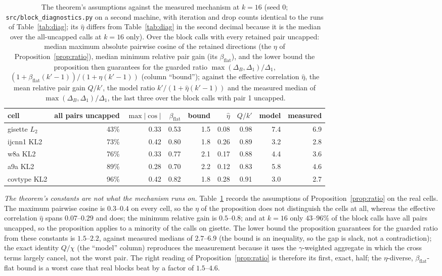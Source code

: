 \begin{table}[t]\centering\scriptsize
\caption{The theorem's assumptions against the measured mechanism at
$k=16$ (seed 0; \texttt{src/block\_diagnostics.py} on a second machine,
with iteration and drop counts identical to the runs of
Table~\ref{tab:diag}; its $\hat\eta$ differs from Table~\ref{tab:diag}
in the second decimal because it is the median over the all-uncapped
calls at $k=16$ only). Over the
block calls with every retained pair uncapped: median maximum absolute
pairwise cosine of the retained directions (the $\eta$ of
Proposition~\ref{prop:ratio}), median minimum relative pair gain (its
$\beta_{\mathrm{flat}}$), and the lower bound the proposition then
guarantees for the guarded ratio $\max(\Delta_B,\Delta_1)/\Delta_1$,
$(1+\beta_{\mathrm{flat}}(k'-1))/(1+\eta(k'-1))$ (column ``bound''); against
the effective correlation $\hat\eta$, the mean relative pair gain
$Q/k'$, the model ratio $k'/(1+\hat\eta(k'-1))$ and the measured median
of $\max(\Delta_B,\Delta_1)/\Delta_1$, the last three over the block
calls with pair 1 uncapped.}\label{tab:assump}
\begin{tabular}{lrrrrrrrr}\toprule
cell & all pairs uncapped & $\max|\cos|$ & $\beta_{\mathrm{flat}}$ & bound & $\hat\eta$ & $Q/k'$ & model & measured \\\midrule
gisette $L_2$ & 43\% & 0.33 & 0.53 & 1.5 & 0.08 & 0.98 & 7.4 & 6.9 \\
ijcnn1 KL2 & 73\% & 0.42 & 0.80 & 1.8 & 0.26 & 0.89 & 3.2 & 2.8 \\
w8a KL2 & 76\% & 0.33 & 0.77 & 2.1 & 0.17 & 0.88 & 4.4 & 3.6 \\
a9a KL2 & 89\% & 0.28 & 0.70 & 2.2 & 0.12 & 0.83 & 5.8 & 4.6 \\
covtype KL2 & 96\% & 0.42 & 0.82 & 1.8 & 0.28 & 0.91 & 3.0 & 2.7 \\
\bottomrule\end{tabular}\end{table}

\emph{The theorem's constants are not what the mechanism runs on.}
Table~\ref{tab:assump} records the assumptions of
Proposition~\ref{prop:ratio} on the real cells. The maximum pairwise
cosine is $0.3$--$0.4$ on every cell, so the $\eta$ of the proposition
does not distinguish the cells at all, whereas the effective correlation
$\hat\eta$ spans $0.07$--$0.29$ and does; the minimum relative gain is
$0.5$--$0.8$; and at $k=16$ only $43$--$96\%$ of the block calls have all
pairs uncapped, so the proposition applies to a minority of the calls on
gisette. The lower bound the proposition guarantees for the guarded
ratio from these constants is $1.5$--$2.2$, against measured medians of
$2.7$--$6.9$ (the bound is an inequality, so the gap is slack, not a
contradiction); the exact
identity $Q/\chi$ (the ``model'' column) reproduces the measurement
because it uses the $\gamma$-weighted aggregate in which the cross terms
largely cancel, not the worst pair. The right reading of
Proposition~\ref{prop:ratio} is therefore its first, exact, half; the
$\eta$-diverse, $\beta_{\mathrm{flat}}$-flat bound is a worst case that real blocks beat
by a factor of $1.5$--$4.6$.

